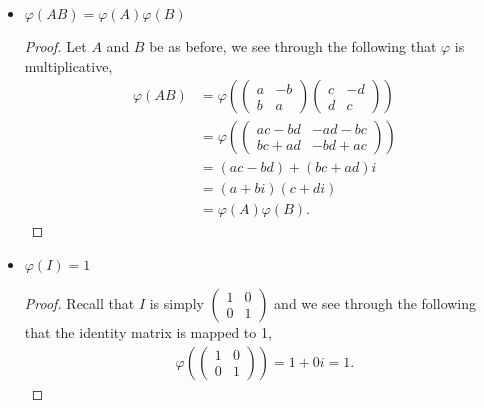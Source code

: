 \documentclass[11pt]{article}
\newenvironment{problem}[2][Problem\!]{\begin{trivlist}
\item[\hskip \labelsep {\bfseries #1}\hskip \labelsep {\bfseries #2.}]}{\end{trivlist}}
\newcommand{\lrp}[1]{\left(#1\right)}
\renewcommand{\phi}{\varphi}
\begin{document}
\begin{problem}{1.2}
\begin{itemize}
\begin{itemize}
\item[(ii)] $\phi(AB) = \phi(A)\phi(B)$
\begin{example}
    \begin{proof}
        Let $A$ and $B$ be as before, we see through the following that $\phi$ is multiplicative,
        \begin{align*}
            \phi(AB) &= \phi\lrp{\begin{pmatrix}
                a & -b \\ b & a
            \end{pmatrix} \begin{pmatrix}
                c & -d \\ d & c
            \end{pmatrix}} \\
            &=\phi\lrp{\begin{pmatrix}ac -bd & -ad-bc \\ bc + ad & -bd + ac  \end{pmatrix}} \\
            &= (ac-bd) + (bc+ad)i \\
            &= (a+bi)(c+di) \\
            &= \phi(A)\phi(B).
        \end{align*}
    \end{proof}
\end{example} 

\item[(iii)] $\phi(I) = 1$
\begin{example}
    \begin{proof}
        Recall that $I$ is simply $\begin{pmatrix}
            1 & 0 \\ 0 & 1
        \end{pmatrix}$
        and we see through the following that the identity matrix is mapped to 1,
        \begin{align}
            \phi\lrp{\begin{pmatrix}1 & 0 \\ 0 & 1\end{pmatrix}} = 1 + 0i = 1.
        \end{align}
    \end{proof}
\end{example} 

\end{itemize}


\end{itemize}
\end{problem}
\end{document}
